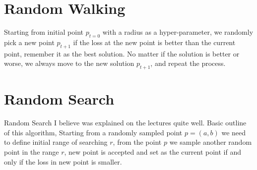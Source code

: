 \documentclass{article}
\begin{document}
\break

\section{Random Walking}

Starting from initial point $p_{t=0}$ with a radius as a hyper-parameter, we randomly pick a new point $p_{t+1}$ if the loss at the new point is better than the current point, remember it as the best solution. No matter if the solution is better or worse, we always move to the new solution $p_{t+1}$, and repeat the process.

\section{Random Search}

Random Search I believe was explained on the lectures quite well. Basic outline of this algorithm, Starting from a randomly sampled point $p = (a, b)$ we need to define initial range of searching $r$, from the point $p$ we sample another random point in the range $r$, new point is accepted and set as the current point if and only if the loss in new point is smaller.
\end{document}
